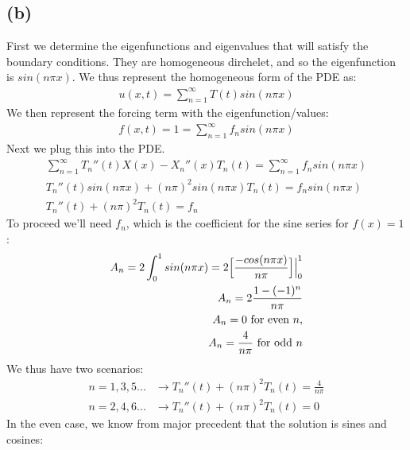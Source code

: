 \documentclass{article}
\begin{document}
\subsection*{\textbf{(b)}}
First we determine the eigenfunctions and eigenvalues that will satisfy the boundary conditions. They are homogeneous dirchelet, and so the eigenfunction is $sin(n\pi x)$. We thus represent the homogeneous form of the PDE as:
\begin{equation}
\begin{aligned}
u(x,t) = \sum_{n=1}^{\infty}T(t)sin(n\pi x)
\end{aligned}
\end{equation}
We then represent the forcing term with the eigenfunction/values:
\begin{equation}
\begin{aligned}
f(x,t) = 1 = \sum_{n=1}^{\infty}f_n sin(n\pi x)
\end{aligned}
\end{equation}
Next we plug this into the PDE. 
\begin{equation}
\begin{aligned}
\sum_{n=1}^{\infty} T_n''(t)X(x) - X_n''(x)T_n(t) = \sum_{n=1}^{\infty}f_n sin(n\pi x)\\
T_n''(t)sin(n\pi x) + (n\pi)^2 sin(n\pi x)T_n(t) = f_nsin(n\pi x)\\
T_n''(t) + (n\pi)^2T_n(t) = f_n
\end{aligned}
\end{equation}
To proceed we'll need $f_n$, which is the coefficient for the sine series for $f(x) = 1$:
\begin{equation}
\begin{aligned}
A_n  = 2\int_0^1sin(n\pi x) = 2\Big{[}\frac{-cos(n\pi x)}{n\pi}\Big{]}\Big{|}_0^1\\
A_n = 2\frac{1-(-1)^n}{n\pi}\\
A_n = 0 \text{ for even } n,\\
A_n = \frac{4}{n\pi} \text{ for odd } n
\end{aligned}
\end{equation}
We thus have two scenarios:
\begin{equation}
\begin{aligned}
n = 1, 3, 5... &\to T_n''(t) + (n\pi)^2T_n(t) = \frac{4}{n\pi}\\
n = 2, 4, 6... &\to T_n''(t) + (n\pi)^2T_n(t) = 0
\end{aligned}
\end{equation}
In the even case, we know from major precedent that the solution is sines and cosines:
\end{document}
